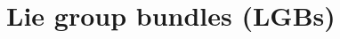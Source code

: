 \documentclass[a4paper,oneside,11pt,bibliography=totoc]{scrartcl}
\def\ba#1\ea{\begin{align}#1\end{align}}
\theoremstyle{plain}
\theoremstyle{remark}
\theoremstyle{definition}
\begin{document}
%
%

\section{Lie group bundles (LGBs)}\label{LGBSection}
\end{document}
